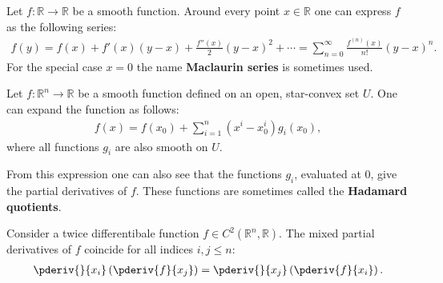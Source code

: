     \begin{property}
        Let $f:\mathbb{R}\rightarrow\mathbb{R}$ be a smooth function. Around every point $x\in\mathbb{R}$ one can express $f$ as the following series:
        \begin{gather}
            f(y) = f(x) + f'(x)(y-x) + \frac{f''(x)}{2}(y-x)^2 + \cdots = \sum_{n=0}^\infty\frac{f^{(n)}(x)}{n!}(y-x)^n.
        \end{gather}
        For the special case $x=0$ the name \textbf{Maclaurin series} is sometimes used.
    \end{property}


    \begin{theorem}
        Let $f:\mathbb{R}^n\rightarrow\mathbb{R}$ be a smooth function defined on an open, star-convex set $U$. One can expand the function as follows:
        \begin{gather}
            f(x) = f(x_0) + \sum_{i=1}^n(x^i-x^i_0)g_i(x_0),
        \end{gather}
        where all functions $g_i$ are also smooth on $U$.
    \end{theorem}
    From this expression one can also see that the functions $g_i$, evaluated at 0, give the partial derivatives of $f$. These functions are sometimes called the \textbf{Hadamard quotients}.

    \begin{theorem}\label{calculus:schwarz_theorem}
        Consider a twice differentibale function $f\in C^2(\mathbb{R}^n,\mathbb{R})$. The mixed partial derivatives of $f$ coincide for all indices $i,j\leq n$:
        \begin{gather}
            \pderiv{}{x_i}\left(\pderiv{f}{x_j}\right) = \pderiv{}{x_j}\left(\pderiv{f}{x_i}\right).
        \end{gather}
    \end{theorem}

